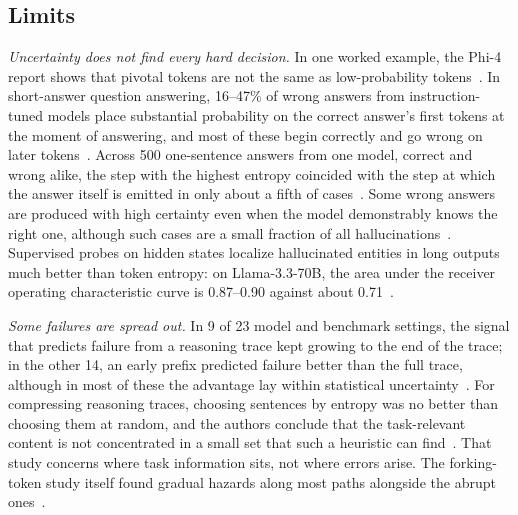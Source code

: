 \documentclass{ieeeaccess}
\begin{document}
\subsection{Limits}
\emph{Uncertainty does not find every hard decision.} In one worked example, the Phi-4 report shows that pivotal tokens are not the same as low-probability tokens~\cite{abdin2024phi4}. In short-answer question answering, 16--47\% of wrong answers from instruction-tuned models place substantial probability on the correct answer's first tokens at the moment of answering, and most of these begin correctly and go wrong on later tokens~\cite{yeom2026commit}. Across 500 one-sentence answers from one model, correct and wrong alike, the step with the highest entropy coincided with the step at which the answer itself is emitted in only about a fifth of cases~\cite{yeom2026commit}. Some wrong answers are produced with high certainty even when the model demonstrably knows the right one, although such cases are a small fraction of all hallucinations~\cite{simhi2025choke}. Supervised probes on hidden states localize hallucinated entities in long outputs much better than token entropy: on Llama-3.3-70B, the area under the receiver operating characteristic curve is 0.87--0.90 against about 0.71~\cite{obeso2025entities}.

\emph{Some failures are spread out.} In 9 of 23 model and benchmark settings, the signal that predicts failure from a reasoning trace kept growing to the end of the trace; in the other 14, an early prefix predicted failure better than the full trace, although in most of these the advantage lay within statistical uncertainty~\cite{thoria2026fail}. For compressing reasoning traces, choosing sentences by entropy was no better than choosing them at random, and the authors conclude that the task-relevant content is not concentrated in a small set that such a heuristic can find~\cite{candussio2026demyst}. That study concerns where task information sits, not where errors arise. The forking-token study itself found gradual hazards along most paths alongside the abrupt ones~\cite{bigelow2025forking}.
\end{document}
